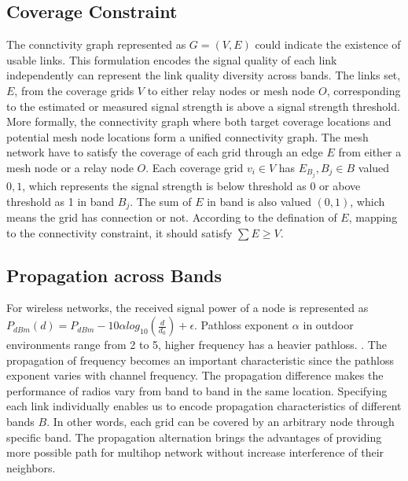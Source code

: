 \subsection{Coverage Constraint}
\label{subsec:ccconstraint}
The connctivity graph represented as $G=(V,E)$ could indicate the existence of usable links. This formulation encodes the signal quality of each link independently can represent the link quality diversity across bands.
The links set, $E$, from the coverage grids $V$ to either relay nodes or mesh node $O$, corresponding to the estimated or measured signal strength is above a signal strength threshold. 
More formally, the connectivity graph where both target coverage locations and potential mesh node locations form a unified connectivity graph.
The mesh network have to satisfy the coverage of each grid through an edge $E$ from either a mesh node or a relay node $O$.
Each coverage grid $v_i\in {V}$ has $E_{B_j},{B_j}\in {B}$ valued ${0,1}$, which represents the signal strength is below threshold as 0 or above threshold as 1 in band $B_j$.
The sum of $E$ in band is also valued $(0,1)$, which means the grid has connection or not.
According to the defination of $E$, mapping to the connectivity constraint, it should satisfy $\sum{E}\geq V$.




\subsection{Propagation across Bands}
 For wireless networks, the received signal power of a node is represented as $P_{dBm}(d)=P_{dBm}-10\alpha log_{10}(\frac{d}{d_0})+\epsilon$. Pathloss exponent $\alpha$ in outdoor environments range from 2 to 5, higher frequency has a heavier pathloss. \cite{camp2006measurement}. 
The propagation of frequency becomes an important characteristic since the pathloss exponent varies with channel frequency. The propagation difference makes the performance of radios vary from band to band in the same location. 
Specifying each link individually enables us to encode propagation characteristics of different bands $B$. In other words, each grid can be covered by an arbitrary node through specific band.  
The propagation alternation brings the advantages of providing more possible path for multihop network without increase interference of their neighbors. 


